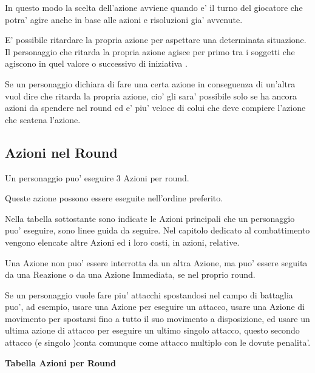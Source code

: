 \documentclass[a4paper,11pt,twoside,openany]{book}
\begin{document}
In questo modo la scelta dell'azione avviene quando e' il turno del giocatore che potra' agire anche in base alle azioni e risoluzioni gia' avvenute.

E' possibile ritardare la propria azione per aspettare una determinata situazione. Il personaggio che ritarda la propria azione agisce per primo tra i soggetti che agiscono in quel valore o successivo di iniziativa .

Se un personaggio dichiara di fare una certa azione in conseguenza di un'altra vuol dire che ritarda la propria azione, cio' gli sara' possibile solo se ha ancora azioni da spendere nel round ed e' piu' veloce di colui che deve compiere l'azione che scatena l'azione.

\subsection{Azioni nel Round}

\label{azioni-nel-round}

Un personaggio puo' eseguire 3 Azioni per round.

Queste azione possono essere eseguite nell'ordine preferito.

Nella tabella sottostante sono indicate le Azioni principali che un personaggio puo' eseguire, sono linee guida da seguire. Nel capitolo dedicato al combattimento vengono elencate altre Azioni ed i loro costi, in azioni, relative.

Una Azione non puo' essere interrotta da un altra Azione, ma puo' essere seguita da una Reazione o da una Azione Immediata, se nel proprio round.

Se un personaggio vuole fare piu' attacchi spostandosi nel campo di battaglia puo', ad esempio, usare una Azione per eseguire un attacco, usare una Azione di movimento per spostarsi fino a tutto il suo movimento a disposizione, ed usare un ultima azione di attacco per eseguire un ultimo singolo attacco, questo secondo attacco (e singolo )conta comunque come attacco multiplo con le dovute penalita'.

\medskip

\textbf{Tabella Azioni per Round}

\medskip
\end{document}
